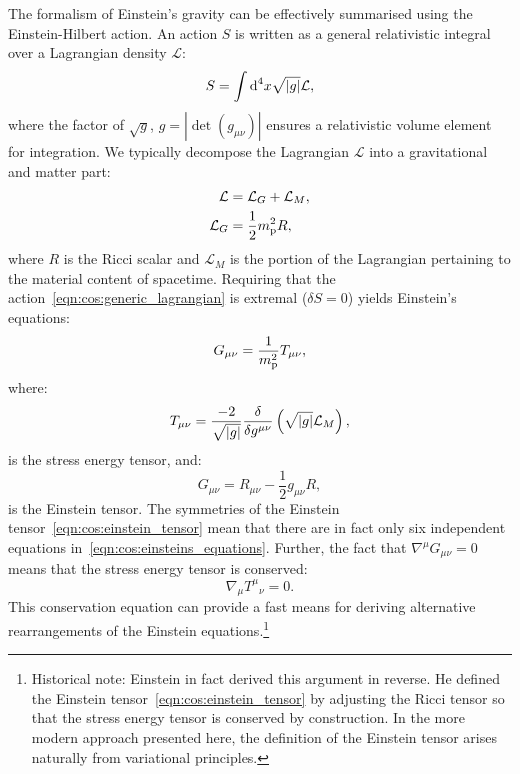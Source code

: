 The formalism of Einstein's gravity can be effectively summarised using the Einstein-Hilbert action. An action \(S\) is written as a general relativistic integral over a Lagrangian density \(\mathcal{L}\):
\begin{equation}
  S = \int\d[4]{x} \sqrt{|g|} \mathcal{L},
  \label{eqn:cos:generic_lagrangian}
\end{equation}
where the factor of \(\sqrt{g}\), \(g=\left|\det\left( g_{\mu\nu} \right)\right|\) ensures a relativistic volume element for integration.
We typically decompose the Lagrangian \(\mathcal{L}\) into a gravitational and matter part:
\begin{align}
  \mathcal{L} &= \mathcal{L}_G + \mathcal{L}_M,
  \label{eqn:cos:decomp}\\
  \mathcal{L}_G &= \frac{1}{2} \m^2 R,
  \label{eqn:cos:L_grav}
\end{align}
where \(R\) is the Ricci scalar and \(\mathcal{L}_M\) is the portion of the Lagrangian pertaining to the material content of spacetime. Requiring that the action~\eqref{eqn:cos:generic_lagrangian} is extremal (\(\delta S = 0\)) yields Einstein's equations:
\begin{equation}
  G_{\mu\nu} = \frac{1}{\m^2}T_{\mu\nu},
  \label{eqn:cos:einsteins_equations}
\end{equation}
where:
\begin{equation}
  T_{\mu\nu} = \frac{-2}{\sqrt{\abs{g}}}\frac{\delta}{\delta g^{\mu\nu}}\left( \sqrt{\abs{g}} \mathcal{L}_M \right),
  \label{eqn:cos:SET_fundamantal}
\end{equation}
is the stress energy tensor, and:
\begin{equation}
  G_{\mu\nu} = R_{\mu\nu} - \frac{1}{2}g_{\mu\nu} R,
  \label{eqn:cos:einstein_tensor}
\end{equation}
is the Einstein tensor. The symmetries of the Einstein tensor~\eqref{eqn:cos:einstein_tensor} mean that there are in fact only six independent equations in~\eqref{eqn:cos:einsteins_equations}. Further, the fact that \(\nabla^\mu G_{\mu\nu}=0\) means that the stress energy tensor is conserved:
\begin{equation}
  \nabla_\mu {T^{\mu}}_{\nu} = 0.
  \label{eqn:cos:SET_conservation}
\end{equation}
This conservation equation can provide a fast means for deriving alternative rearrangements of the Einstein equations.\footnote{Historical note: Einstein in fact derived this argument in reverse. He defined the Einstein tensor~\protect\eqref{eqn:cos:einstein_tensor} by adjusting the Ricci tensor so that the stress energy tensor is conserved by construction. In the more modern approach presented here, the definition of the Einstein tensor arises naturally from variational principles.}

